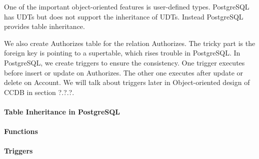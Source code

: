 \documentclass[11pt]{article}
\begin{document}
\par
One of the important object-oriented features is user-defined types. PostgreSQL has UDTs but does not support the inheritance of UDTs. Instead PostgreSQL provides table inheritance.

We also create Authorizes table for the relation Authorizes. The tricky part is the foreign key is pointing to a supertable, which rises trouble in PostgreSQL. In PostgreSQL, we create triggers to ensure the consistency. One trigger executes before insert or update on Authorizes. The other one executes after update or delete on Account. We will talk about triggers later in Object-oriented design of CCDB in section ?.?.?.

\paragraph{Table Inheritance in PostgreSQL}

\paragraph{Functions}

\paragraph{Triggers}
\end{document}
